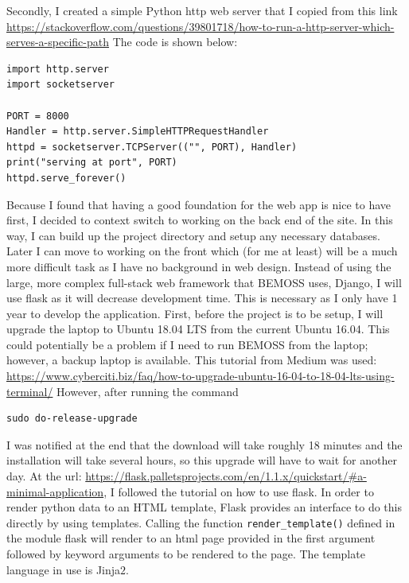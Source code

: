 \documentclass[fontsize=11pt, %
                             paper=letter, %
                             twoside, %
                             captions=tableheading,
                             index=totoc,
                             hyperref]{labbook}
\begin{document}
\begin{addmargin}[0cm]{0cm}
Secondly, I created a simple Python http web server that I copied from this link
\smallbreak\noindent
\url{https://stackoverflow.com/questions/39801718/how-to-run-a-http-server-which-serves-a-specific-path}
The code is shown below:
\begin{Verbatim}
import http.server
import socketserver

PORT = 8000
Handler = http.server.SimpleHTTPRequestHandler
httpd = socketserver.TCPServer(("", PORT), Handler)
print("serving at port", PORT)
httpd.serve_forever()
\end{Verbatim}

Because I found that having a good foundation for the web app is nice to have first, I decided to context switch to working on the back end of the site. In this way, I can build up the project directory and setup any necessary databases. Later I can move to working on the front which (for me at least) will be a much more difficult task as I have no background in web design. Instead of using the large, more complex full-stack web framework that BEMOSS uses, Django, I will use flask as it will decrease development time. This is necessary as I only have 1 year to develop the application. First, before the project is to be setup, I will upgrade the laptop to Ubuntu 18.04 LTS from the current Ubuntu 16.04. This could potentially be a problem if I need to run BEMOSS from the laptop; however, a backup laptop is available. This tutorial from Medium was used:
\url{https://www.cyberciti.biz/faq/how-to-upgrade-ubuntu-16-04-to-18-04-lts-using-terminal/}
However, after running the command
\begin{Verbatim}
sudo do-release-upgrade
\end{Verbatim} 
I was notified at the end that the download will take roughly 18 minutes and the installation will take several hours, so this upgrade will have to wait for another day. At the url:
\url{https://flask.palletsprojects.com/en/1.1.x/quickstart/#a-minimal-application}, I followed the tutorial on how to use flask. In order to render python data to an HTML template, Flask provides an interface to do this directly by using templates. Calling the function \texttt{render\_template()} defined in the module flask will render to an html page provided in the first argument followed by keyword arguments to be rendered to the page. The template language in use is Jinja$2$.


\end{addmargin}
\end{document}
